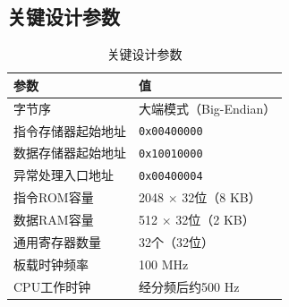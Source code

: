 \subsection{关键设计参数}

\begin{table}[H]
    \centering
    \caption{关键设计参数}
    \begin{tabular}{ll}
        \toprule
        \textbf{参数} & \textbf{值} \\
        \midrule
        字节序 & 大端模式（Big-Endian） \\
        指令存储器起始地址 & \texttt{0x00400000} \\
        数据存储器起始地址 & \texttt{0x10010000} \\
        异常处理入口地址 & \texttt{0x00400004} \\
        指令ROM容量 & 2048 $\times$ 32位（8 KB） \\
        数据RAM容量 & 512 $\times$ 32位（2 KB） \\
        通用寄存器数量 & 32个（32位） \\
        板载时钟频率 & 100 MHz \\
        CPU工作时钟 & 经分频后约500 Hz \\
        \bottomrule
    \end{tabular}
\end{table}
